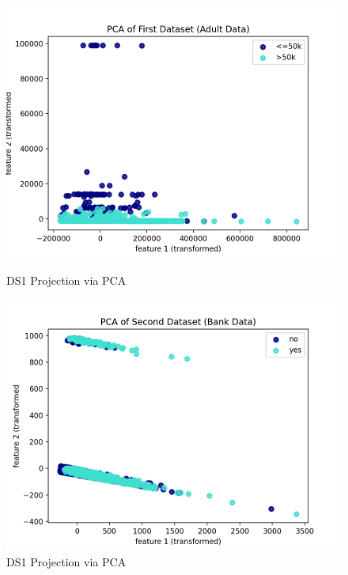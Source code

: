 \begin{figure}
    \begin{minipage}{0.5\textwidth}
        \centering
        \includegraphics[width=.9\linewidth]{pcads1.png}
        \caption{DS1 Projection via PCA}\label{Fig:PCA DS1}
    \end{minipage}\hfill
    \begin{minipage}{0.5\textwidth}
        \centering
        \includegraphics[width=.9\linewidth]{pcads2.png}
        \caption{DS1 Projection via PCA}\label{Fig:PCA DS2}
    \end{minipage}
\end{figure}

